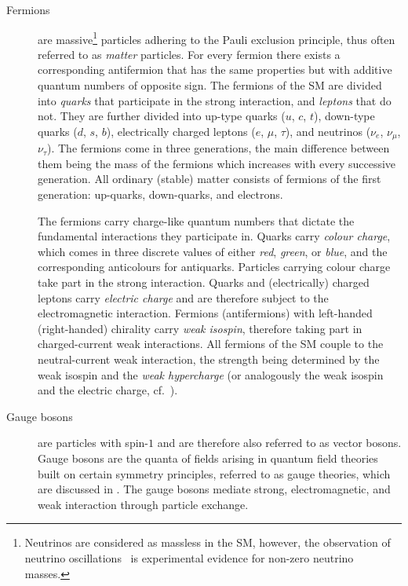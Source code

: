 \begin{description}

\item[Fermions] are massive\footnote{Neutrinos are considered as massless in the
    SM, however, the observation of neutrino
    oscillations~\cite{Super-Kamiokande:1998kpq,SNO:2002tuh} is experimental
    evidence for non-zero neutrino masses.} particles adhering to the Pauli
  exclusion principle, thus often referred to as \emph{matter} particles. For
  every fermion there exists a corresponding antifermion that has the same
  properties but with additive quantum numbers of opposite sign. The fermions of
  the SM are divided into \emph{quarks} that participate in the strong
  interaction, and \emph{leptons} that do not. They are further divided into
  up-type quarks ($u$, $c$, $t$), down-type quarks ($d$, $s$, $b$), electrically
  charged leptons ($e$, $\mu$, $\tau$), and neutrinos ($\nu_e$, $\nu_\mu$,
  $\nu_\tau$). The fermions come in three generations, the main difference
  between them being the mass of the fermions which increases with every
  successive generation. All ordinary (stable) matter consists of fermions of
  the first generation: up-quarks, down-quarks, and electrons.

  The fermions carry charge-like quantum numbers that dictate the fundamental
  interactions they participate in. Quarks carry \emph{colour charge}, which
  comes in three discrete values of either \emph{red}, \emph{green}, or
  \emph{blue}, and the corresponding anticolours for antiquarks. Particles
  carrying colour charge take part in the strong interaction. Quarks and
  (electrically) charged leptons carry \emph{electric charge} and are therefore
  subject to the electromagnetic interaction. Fermions (antifermions) with
  left-handed (right-handed) chirality carry \emph{weak isospin}, therefore
  taking part in charged-current weak interactions. All fermions of the SM
  couple to the neutral-current weak interaction, the strength being determined
  by the weak isospin and the \emph{weak hypercharge} (or analogously the weak
  isospin and the electric charge, cf.~).

\item[Gauge bosons] are particles with spin-$1$ and are therefore also referred
  to as vector bosons. Gauge bosons are the quanta of fields arising in quantum
  field theories built on certain symmetry principles, referred to as gauge
  theories, which are discussed in . The
  gauge bosons mediate strong, electromagnetic, and weak interaction through
  particle exchange.


\end{description}
